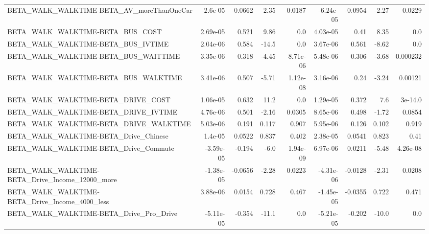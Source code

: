 \begin{tabular}{lrrrrrrrr}
BETA\_WALK\_WALKTIME-BETA\_AV\_moreThanOneCar          &    -2.6e-05 &      -0.0662 &     -2.35 &   0.0187 &  -6.24e-05 &     -0.0954 &        -2.27 &        0.0229 \\
BETA\_WALK\_WALKTIME-BETA\_BUS\_COST                   &    2.69e-05 &        0.521 &      9.86 &      0.0 &   4.03e-05 &        0.41 &         8.35 &           0.0 \\
BETA\_WALK\_WALKTIME-BETA\_BUS\_IVTIME                 &    2.04e-06 &        0.584 &     -14.5 &      0.0 &   3.67e-06 &       0.561 &        -8.62 &           0.0 \\
BETA\_WALK\_WALKTIME-BETA\_BUS\_WAITTIME               &    3.35e-06 &        0.318 &     -4.45 & 8.71e-06 &   5.48e-06 &       0.306 &        -3.68 &      0.000232 \\
BETA\_WALK\_WALKTIME-BETA\_BUS\_WALKTIME               &    3.41e-06 &        0.507 &     -5.71 & 1.12e-08 &   3.16e-06 &        0.24 &        -3.24 &       0.00121 \\
BETA\_WALK\_WALKTIME-BETA\_DRIVE\_COST                 &    1.06e-05 &        0.632 &      11.2 &      0.0 &   1.29e-05 &       0.372 &          7.6 &       3e-14.0 \\
BETA\_WALK\_WALKTIME-BETA\_DRIVE\_IVTIME               &    4.76e-06 &        0.501 &     -2.16 &   0.0305 &   8.65e-06 &       0.498 &        -1.72 &        0.0854 \\
BETA\_WALK\_WALKTIME-BETA\_DRIVE\_WALKTIME             &    5.03e-06 &        0.191 &     0.117 &    0.907 &   5.95e-06 &       0.126 &        0.102 &         0.919 \\
BETA\_WALK\_WALKTIME-BETA\_Drive\_Chinese              &     1.4e-05 &       0.0522 &     0.837 &    0.402 &   2.38e-05 &      0.0541 &        0.823 &          0.41 \\
BETA\_WALK\_WALKTIME-BETA\_Drive\_Commute              &   -3.59e-05 &       -0.194 &      -6.0 & 1.94e-09 &   6.97e-06 &      0.0211 &        -5.48 &      4.26e-08 \\
BETA\_WALK\_WALKTIME-BETA\_Drive\_Income\_12000\_more    &   -1.38e-05 &      -0.0656 &     -2.28 &   0.0223 &  -4.31e-06 &     -0.0128 &        -2.31 &        0.0208 \\
BETA\_WALK\_WALKTIME-BETA\_Drive\_Income\_4000\_less     &    3.88e-06 &       0.0154 &     0.728 &    0.467 &  -1.45e-05 &     -0.0355 &        0.722 &         0.471 \\
BETA\_WALK\_WALKTIME-BETA\_Drive\_Pro\_Drive            &   -5.11e-05 &       -0.354 &     -11.1 &      0.0 &  -5.21e-05 &      -0.202 &        -10.0 &           0.0 \\

\end{tabular}
